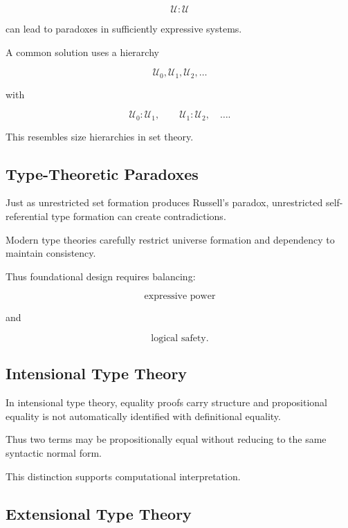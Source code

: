 \[
\mathcal{U}:\mathcal{U}
\]

can lead to paradoxes in sufficiently expressive systems.

A common solution uses a hierarchy

\[
\boxed{
\mathcal{U}_0,
\mathcal{U}_1,
\mathcal{U}_2,
\ldots
}
\]

with

\[
\boxed{
\mathcal{U}_0:\mathcal{U}_1,
\qquad
\mathcal{U}_1:\mathcal{U}_2,
\quad\ldots.
}
\]

This resembles size hierarchies in set theory.

\subsection{Type-Theoretic Paradoxes}
\label{subsec:type-theoretic-paradoxes}

Just as unrestricted set formation produces Russell's paradox, unrestricted
self-referential type formation can create contradictions.

Modern type theories carefully restrict universe formation and dependency
to maintain consistency.

Thus foundational design requires balancing:

\[
\boxed{
\text{expressive power}
}
\]

and

\[
\boxed{
\text{logical safety}.
}
\]

\subsection{Intensional Type Theory}
\label{subsec:intensional-type-theory}

In intensional type theory, equality proofs carry structure and
propositional equality is not automatically identified with definitional
equality.

Thus two terms may be propositionally equal without reducing to the same
syntactic normal form.

This distinction supports computational interpretation.

\subsection{Extensional Type Theory}
\label{subsec:extensional-type-theory}

